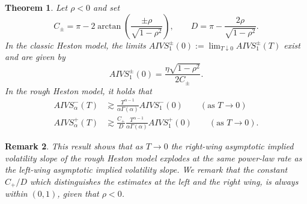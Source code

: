 \documentclass[12pt,a4paper]{amsart}
\numberwithin{equation}{section}
\numberwithin{equation}{section}
\newtheorem{theorem}{Theorem}[section]
\newtheorem{remark}[theorem]{Remark}
\theoremstyle{nonumberplain}
\begin{document}
\begin{theorem}\label{thm:AIVS_smallT}
Let $\rho <0$ and set
\[C_\pm = \pi  - 2\arctan\left(\frac{\pm \rho}{\sqrt{1 - \rho^2}}\right), \qquad  D = \pi - \frac{2\rho}{\sqrt{1 - \rho^2}}.\]
In the classic Heston model, the limits $AIVS_1^\pm(0) := \lim_{T \downarrow 0} AIVS_1^\pm(T)$ exist and are given by
\begin{equation}
AIVS_1^\pm(0) = \frac{\eta \sqrt{1 - \rho^2}}{2 C_\pm}. 
\end{equation}
In the rough Heston model, it holds that
\begin{subequations}\label{eq:AIVS_small_t}
\begin{align}
AIVS_\alpha^-(T) &\gtrsim \frac{T^{\alpha -1}}{\alpha \Gamma(\alpha )} AIVS_1^-(0) \qquad (\text{as }T \to 0) \label{eq:AIVS_small_t-}\\
AIVS_\alpha^+(T) &\gtrsim \frac{C_+}{D} \frac{T^{\alpha -1}}{\alpha \Gamma(\alpha )} AIVS_1^+(0) \qquad (\text{as }T \to 0). \label{eq:AIVS_small_t+}
\end{align}
\end{subequations}
\end{theorem}
\begin{remark}
This result shows that as $T \to 0$ the right-wing asymptotic implied volatility slope of the rough Heston model explodes at the same power-law rate as the left-wing asymptotic implied volatility slope. We remark that the constant $C_+/D$ which distinguishes the estimates at the left and the right wing, is always within $(0,1)$, given that $\rho < 0$.
\end{remark}
\end{document}
